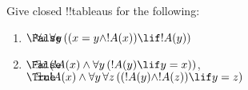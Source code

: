 \documentclass[../../../include/open-logic-section]{subfiles}
\begin{document}
\begin{prob}
Give closed !!{tableau}s for the following:
\begin{enumerate}
\item $\sFmla{\False}{\lforall[x][\lforall[y][((x = y \land !A(x))
      \lif !A(y))]]}$
\item $\sFmla{\False}{\lexists[x][(!A(x) \land
    \lforall[y][(!A(y) \lif y = x)])]}$,\\
  $\sFmla{\True}{\lexists[x][!A(x)] \land
    \lforall[y][\lforall[z][((!A(y) \land !A(z)) \lif y = z)]]}$
\end{enumerate}
\end{prob}
\end{document}
